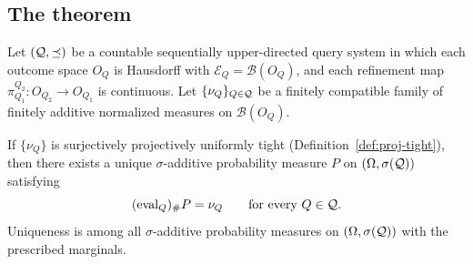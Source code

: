 \subsection*{The theorem}

\begin{theorem}
\label{thm:prokhorov}
Let $(\mathcal{Q},\preceq)$ be a countable sequentially upper-directed
query system in which each outcome space $O_Q$ is Hausdorff with
$\mathcal{E}_Q=\mathcal{B}(O_Q)$, and each refinement map
$\pi^{Q_2}_{Q_1}:O_{Q_2}\to O_{Q_1}$ is continuous.
Let $\{\nu_Q\}_{Q\in\mathcal{Q}}$ be a finitely compatible family of
finitely additive normalized measures on $\mathcal{B}(O_Q)$.

If $\{\nu_Q\}$ is surjectively projectively uniformly tight
(Definition~\ref{def:proj-tight}), then there exists a unique
$\sigma$-additive probability measure $P$ on $(\Omega,\sigma(\mathcal{Q}))$
satisfying
\[
(\mathrm{eval}_Q)_\#P=\nu_Q
\qquad\text{for every }Q\in\mathcal{Q}.
\]
Uniqueness is among all $\sigma$-additive probability measures on
$(\Omega,\sigma(\mathcal{Q}))$ with the prescribed marginals.
\end{theorem}

